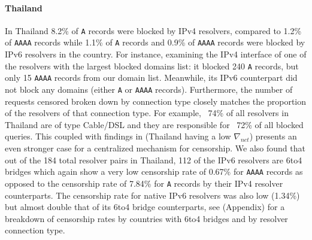\paragraph{Thailand} 
In Thailand 8.2\% of \texttt{A} records were blocked by IPv4 resolvers,
compared to 1.2\% of \texttt{AAAA} records while 1.1\% of \texttt{A} records
and 0.9\% of \texttt{AAAA} records were blocked by IPv6 resolvers in the
country. 
For instance, examining the IPv4 interface of one of the resolvers with the
largest blocked domains list: it blocked 240 \texttt{A} records, but only 15
\texttt{AAAA} records from our domain list. Meanwhile, its IPv6 counterpart did
not block any domains (either \texttt{A} or \texttt{AAAA} records). Furthermore,
the number of requests censored broken down by connection type closely matches
the proportion of the resolvers of that connection type. For example, ~74\% of
all resolvers in Thailand are of type Cable/DSL and they are responsible for
~72\% of all blocked queries. This coupled with findings in
 (Thailand having a low $\nabla_{net}$)
presents an even stronger case for a centralized mechanism for censorship. We
also found that out of the 184 total resolver pairs in Thailand, 112 of the IPv6
resolvers are 6to4 bridges which again show a very low censorship rate of 0.67\%
for \texttt{AAAA} records as opposed to the censorship rate of 7.84\% for
\texttt{A} records by their IPv4 resolver counterparts. The censorship rate for
native IPv6 resolvers was also low (1.34\%) but almost double that of its 6to4
bridge counterparts, see  (Appendix) for a
breakdown of censorship rates by countries with 6to4 bridges and by resolver
connection type.






